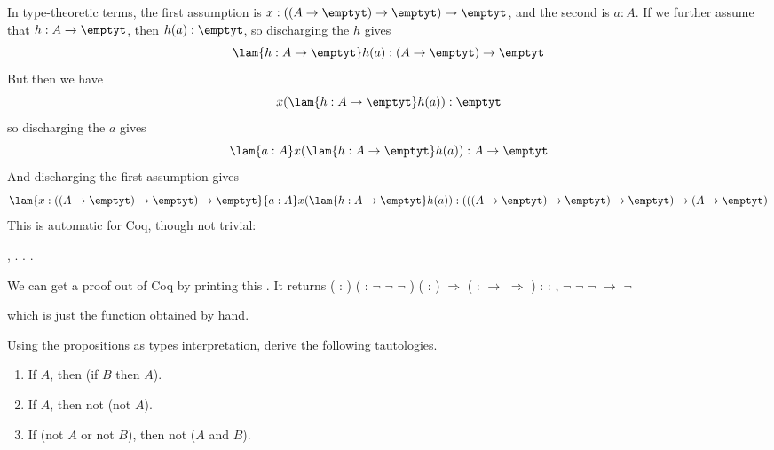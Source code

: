 In type-theoretic terms, the first assumption is $x : ((A \to \emptyt) \to
\emptyt) \to \emptyt$, and the second is $a : A$.  If we further assume that
$h : A \to \emptyt$, then $h(a) : \emptyt$, so discharging the $h$ gives
\[
  \lam{h:A \to \emptyt}h(a) : (A \to \emptyt) \to \emptyt
\]
But then we have
\[
  x(\lam{h : A \to \emptyt}h(a)) : \emptyt
\]
so discharging the $a$ gives
\[
  \lam{a:A}x(\lam{h : A \to \emptyt}h(a)) : A \to \emptyt
\]
And discharging the first assumption gives
\[
  \lam{x:((A\to\emptyt)\to\emptyt)\to\emptyt}{a:A}x(\lam{h : A \to
    \emptyt}h(a)) :
  (((A \to \emptyt) \to \emptyt) \to \emptyt) \to (A \to \emptyt)
\]
This is automatic for Coq, though not trivial: \begin{coqdoccode}
\coqdocemptyline
\coqdocnoindent
{} \coqdockw{\ensuremath{\forall}} , \coqdocnotation{\ensuremath{\lnot}} \coqdocnotation{\ensuremath{\lnot}} \coqdocnotation{\ensuremath{\lnot}}   \coqdocnotation{\ensuremath{\lnot}}. . .\coqdoceol
\coqdocemptyline
\end{coqdoccode}


\noindent 
We can get a proof out of Coq by printing this .  It returns
\coqdoceol
\coqdocemptyline
\coqdocnoindent
{} ( : ) ( : \ensuremath{\lnot} \ensuremath{\lnot} \ensuremath{\lnot} ) ( : ) \ensuremath{\Rightarrow}  (  :  \ensuremath{\rightarrow}  \ensuremath{\Rightarrow}  ) \coqdoceol
\coqdocindent{2.00em}
: \coqdockw{\ensuremath{\forall}}  : , \ensuremath{\lnot} \ensuremath{\lnot} \ensuremath{\lnot}  \ensuremath{\rightarrow} \ensuremath{\lnot} 

\coqdocemptyline
\noindent
which is just the function obtained by hand. \begin{coqdoccode}
\coqdocemptyline
\end{coqdoccode}
Using the propositions as types interpretation, derive the
following tautologies.
\begin{enumerate}
\item If $A$, then (if $B$ then $A$).
\item If $A$, then not (not $A$).
\item If (not $A$ or not $B$), then not ($A$ and $B$).
\end{enumerate} \begin{coqdoccode}
\coqdocemptyline
\end{coqdoccode}


